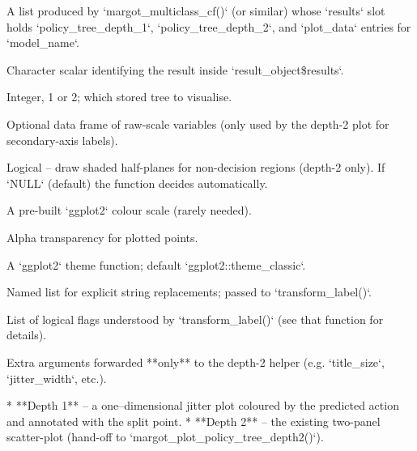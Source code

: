 \documentclass[a4paper]{book}
\begin{document}
\begin{Arguments}
\begin{ldescription}
\item[\code{result\_object}] A list produced by `margot\_multiclass\_cf()` (or similar)
whose `results` slot holds `policy\_tree\_depth\_1`,
`policy\_tree\_depth\_2`, and `plot\_data` entries for `model\_name`.

\item[\code{model\_name}] Character scalar identifying the result inside
`result\_object\$results`.

\item[\code{max\_depth}] Integer, 1 or 2; which stored tree to visualise.

\item[\code{original\_df}] Optional data frame of raw-scale variables (only used
by the depth-2 plot for secondary-axis labels).

\item[\code{shading}] Logical – draw shaded half-planes for non-decision regions
(depth-2 only).  If `NULL` (default) the function decides automatically.

\item[\code{color\_scale}] A pre-built `ggplot2` colour scale (rarely needed).

\item[\code{point\_alpha}] Alpha transparency for plotted points.

\item[\code{theme\_function}] A `ggplot2` theme function; default
`ggplot2::theme\_classic`.

\item[\code{label\_mapping}] Named list for explicit string replacements; passed
to `transform\_label()`.

\item[\code{label\_options}] List of logical flags understood by
`transform\_label()` (see that function for details).

\item[\code{...}] Extra arguments forwarded **only** to the depth-2 helper
(e.g. `title\_size`, `jitter\_width`, etc.).
\end{ldescription}
\end{Arguments}
%
\begin{Details}
* **Depth 1** – a one–dimensional jitter plot coloured by the predicted
action and annotated with the split point.
* **Depth 2** – the existing two-panel scatter-plot (hand-off to
`margot\_plot\_policy\_tree\_depth2()`).
\end{Details}
\end{document}
